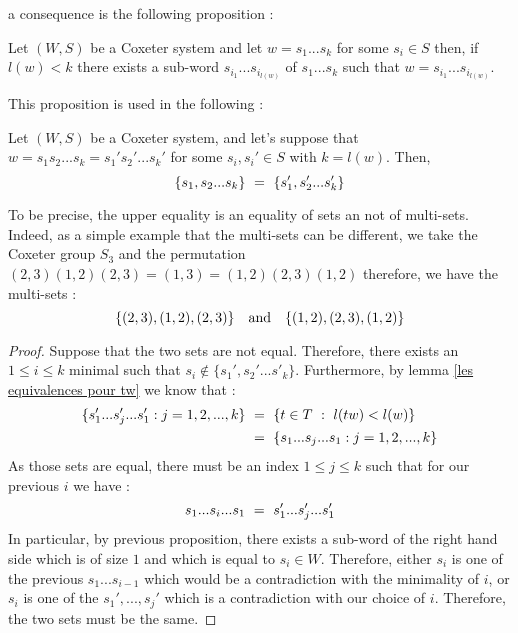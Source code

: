 a consequence is the following proposition :
\begin{proposition}
	Let $(W,S)$ be a Coxeter system and let $w=s_1...s_k$ for some $s_i\in S$ then, if $l(w)<k$ there exists a sub-word $s_{i_1}...s_{i_{l(w)}}$ of $s_1...s_k$ such that $w=s_{i_1}...s_{i_{l(w)}}$.
\end{proposition}
This proposition is used in the following :
\begin{proposition}
	Let $(W,S)$ be a Coxeter system, and let's suppose that $w=s_1s_2...s_k=s_1's_2'...s_k'$ for some $s_i,s_i'\in S$ with $k=l(w) $. Then, \begin{equation}
	\{s_1,s_2...s_k\}\text{ }=\text{ } \{s_1',s_2'...s'_k\}
	\end{equation}
\end{proposition}
\begin{remark}
	To be precise, the upper equality is an equality of sets an not of multi-sets. Indeed, as a simple example that the multi-sets can be different, we take the Coxeter group $S_3$ and the permutation $(2,3)(1,2)(2,3)=(1,3)=(1,2)(2,3)(1,2)$ therefore, we have the multi-sets :
	\begin{equation}
	\{(2,3),(1,2),(2,3)\}\quad \mbox{and}\quad \{(1,2),(2,3),(1,2)\}
	\end{equation}
\end{remark}
\begin{proof}
	Suppose that the two sets are not equal. Therefore, there exists an $1\leq i\leq k$ minimal such that $s_i\not\in  \{s_1',s_2'...s'_k\}$. Furthermore, by lemma \ref{les equivalences pour tw} we know that :
	\begin{equation}
	\begin{split}
	\{s_1'...s_j'...s_1':j=1,2,...,k\}\text{ }&=\text{ } \{t\in T\text{ }:\text{ } l(tw)<l(w)\}\text{ }\\
	&=\text{ } \{s_1...s_j...s_1:j=1,2,...,k\}
	\end{split}
	\end{equation}
	As those sets are equal, there must be an index $1\leq j\leq k$ such that for our previous $i$ we have :
	\begin{equation}
	s_1...s_i...s_1\text{ }=\text{ } s_1'...s_j'...s_1'
	\end{equation}
	In particular, by previous proposition, there exists a sub-word of the right hand side which is of size $1$ and which is equal to $s_i\in W$. Therefore, either $s_i$ is one of the previous $s_1...s_{i-1}$ which would be a contradiction with the minimality of $i$, or $s_i$ is one of the $s_1',...,s_j'$ which is a contradiction with our choice of $i$. Therefore, the two sets must be the same.
\end{proof}